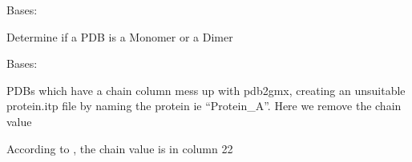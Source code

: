 \documentclass[letterpaper,10pt,english]{sphinxmanual}
\begin{document}
\begin{fulllineitems}
\label{\detokenize{protein:protein.Protein}}
\pysigstartsignatures
{}
\pysigstopsignatures
\sphinxAtStartPar
Bases: 

\begin{fulllineitems}
\label{\detokenize{protein:protein.Protein.check_number_of_chains}}
\pysigstartsignatures
{}
\pysigstopsignatures
\sphinxAtStartPar
Determine if a PDB is a Monomer or a Dimer

\end{fulllineitems}


\end{fulllineitems}


\begin{fulllineitems}
\label{\detokenize{protein:protein.Monomer}}
\pysigstartsignatures
{}
\pysigstopsignatures
\sphinxAtStartPar
Bases: 

\begin{fulllineitems}
\label{\detokenize{protein:protein.Monomer.delete_chain}}
\pysigstartsignatures
{}
\pysigstopsignatures
\sphinxAtStartPar
PDBs which have a chain column mess up with pdb2gmx, creating
an unsuitable protein.itp file by naming the protein ie “Protein\_A”.
Here we remove the chain value

\sphinxAtStartPar
According to ,
the chain value is in column 22

\end{fulllineitems}


\end{fulllineitems}
\end{document}
